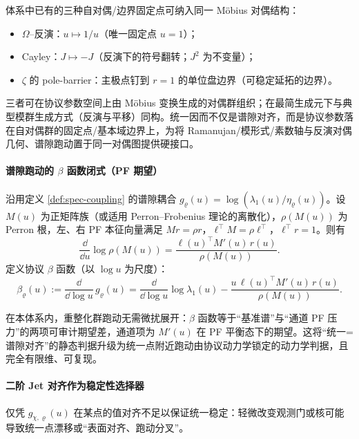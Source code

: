 \begin{proposition}\label{prop:mobius-duality-unified}
体系中已有的三种自对偶/边界固定点可纳入同一 Möbius 对偶结构：
\begin{itemize}
  \item \(\Omega\)--反演：\(u\mapsto 1/u\)（唯一固定点 \(u=1\)）；
  \item Cayley：\(J\mapsto -J\)（反演下的符号翻转；\(J^2\) 为不变量）；
  \item \(\zeta\) 的 pole-barrier：主极点钉到 \(r=1\) 的单位盘边界（可稳定延拓的边界）。
\end{itemize}
三者可在协议参数空间上由 Möbius 变换生成的对偶群组织；在最简生成元下与典型模群生成方式（反演与平移）同构。统一因而不仅是谱隙对齐，而是协议参数落在自对偶群的固定点/基本域边界上，为将 Ramanujan/模形式/素数轴与反演对偶几何、谱隙跑动置于同一对偶图提供硬接口。
\end{proposition}

\paragraph{谱隙跑动的 \(\beta\) 函数闭式（PF 期望）}
沿用定义 \ref{def:spec-coupling} 的谱隙耦合 \(g_{\varrho}(u)=\log(\lambda_1(u)/\eta_{\varrho}(u))\)。设 \(M(u)\) 为正矩阵族（或适用 Perron--Frobenius 理论的离散化），\(\rho(M(u))\) 为 Perron 根，左、右 PF 本征向量满足 \(M r=\rho r\)，\(\ell^\top M=\rho \ell^\top\)，\(\ell^\top r=1\)。则有
\[
\frac{\dd}{\dd u}\log\rho(M(u))
=\frac{\ell(u)^\top M'(u)\,r(u)}{\rho(M(u))}.
\]
定义协议 \(\beta\) 函数（以 \(\log u\) 为尺度）：
\[
\beta_\varrho(u)
:=\frac{\dd}{\dd\log u}\,g_\varrho(u)
=\frac{\dd}{\dd\log u}\log\lambda_1(u)
-\frac{u\,\ell(u)^\top M'(u)\,r(u)}{\rho(M(u))}.
\]

\begin{proposition}\label{prop:beta-pf-expectation}
在本体系内，重整化群跑动无需微扰展开：\(\beta\) 函数等于“基准谱”与“通道 PF 压力”的两项可审计期望差，通道项为 \(M'(u)\) 在 PF 平衡态下的期望。这将“统一=谱隙对齐”的静态判据升级为统一点附近跑动由协议动力学锁定的动力学判据，且完全有限维、可复现。
\end{proposition}

\paragraph{二阶 Jet 对齐作为稳定性选择器}
仅凭 \(g_{\chi,\varrho}(u)\) 在某点的值对齐不足以保证统一稳定：轻微改变观测门或核可能导致统一点漂移或“表面对齐、跑动分叉”。

